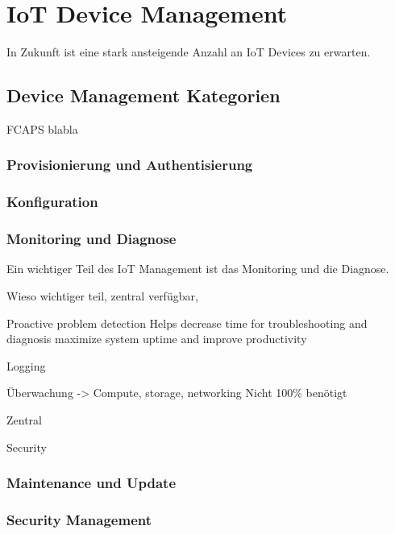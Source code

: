 \chapter{IoT Device Management}
In Zukunft ist eine stark ansteigende Anzahl an IoT Devices zu erwarten. 
\section{Device Management Kategorien}
FCAPS blabla
\subsection{Provisionierung und Authentisierung}
\subsection{Konfiguration}
\subsection{Monitoring und Diagnose}
Ein wichtiger Teil des IoT Management ist das Monitoring und die Diagnose. 


Wieso
wichtiger teil, zentral verfügbar, 





Proactive problem detection 
Helps decrease time for troubleshooting and diagnosis 
maximize system uptime and improve productivity

Logging

Überwachung -> Compute, storage, networking
Nicht 100\% benötigt

Zentral

Security



\subsection{Maintenance und Update}






\subsection{Security Management}



\section{}




















